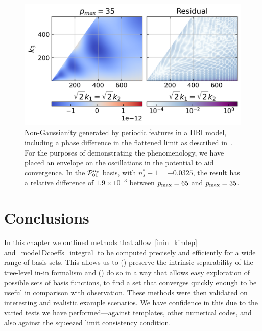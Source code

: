 \begin{figure}[!pth]
\centering
\includegraphics[width=0.99\columnwidth]{plots/tetra_slice_dbi_reso_bump_hq_coolwarm.png}
\caption{
    Non-Gaussianity generated by periodic
    features in a DBI model, including a phase difference
    in the flattened limit as described in~\cite{chen_folded_resonant}.
    For the purposes of demonstrating the phenomenology,
    we have placed an envelope on the oscillations in the potential
    to aid convergence.
    In the $\mathcal{P}^{n_s}_{01}$ basis, with $n_s^{*}-1 = -0.0325$,
    the result has a relative difference of $1.9\times10^{-3}$
    between $p_\text{max}=65$ and $p_\text{max}=35$.
}\label{slice_plot_dbi_reso}
\end{figure}
\section{Conclusions}
    In this chapter we outlined methods that
    allow~\eqref{inin_kindep} and~\eqref{mode1Dcoeffs_integral}
    to be computed precisely and efficiently for a wide range of basis sets.
    This allows us to ({}) preserve the intrinsic separability of the tree-level
    in-in formalism and ({}) do so in a way that allows easy exploration of possible
    sets of basis functions, to find a set that converges quickly enough to
    be useful in comparison with observation. These methods were then validated on interesting and realistic
    example scenarios.
    We have confidence in this due to the varied tests we have performed---against templates,
    other numerical codes, and also against the squeezed limit consistency condition.


